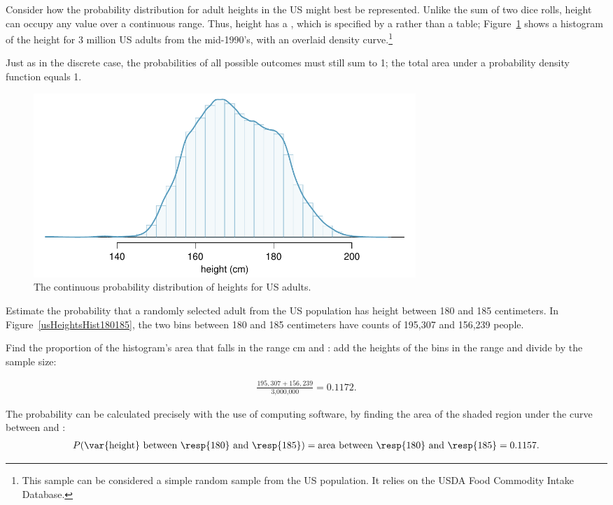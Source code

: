 Consider how the probability distribution for adult heights in the US might best be represented. Unlike the sum of two dice rolls, height can occupy any value over a continuous range. Thus, height has a , which is specified by a  rather than a table; Figure~\ref{fdicHeightContDist} shows a histogram of the height for 3 million US adults from the mid-1990's, with an overlaid density curve.\footnote{This sample can be considered a simple random sample from the US population. It relies on the USDA Food Commodity Intake Database.} 

Just as in the discrete case, the probabilities of all possible outcomes must still sum to 1; the total area under a probability density function equals 1. 

\begin{figure}[h]
	\centering
	\includegraphics[width=0.7\textwidth]{ch_probability_oi_biostat/figures/fdicHeightContDist/fdicHeightContDist}
	\caption{The continuous probability distribution of heights for US adults.}
	\label{fdicHeightContDist}	
\end{figure}

\textD{\newpage}

\begin{examplewrap}
\begin{nexample}{Estimate the probability that a randomly selected adult from the US population has height between 180 and 185 centimeters. In Figure~\ref{usHeightsHist180185}, the two bins between 180 and 185 centimeters have counts of 195,307 and 156,239 people.}\label{probabilityOfBetween180185}%

Find the proportion of the histogram's area that falls in the range  cm and : add the heights of the bins in the range and divide by the sample size:

\begin{align*}                                                    
\frac{195,307+156,239}{\text{3,000,000}} = 0.1172.               
\end{align*}

The probability can be calculated precisely with the use of computing software, by finding the area of the shaded region under the curve between  and :
\begin{align*}
P(\text{\var{height} between \resp{180} and \resp{185}})
= \text{area between \resp{180} and \resp{185}}
= 0.1157.
\end{align*}
\end{nexample}
\end{examplewrap}


